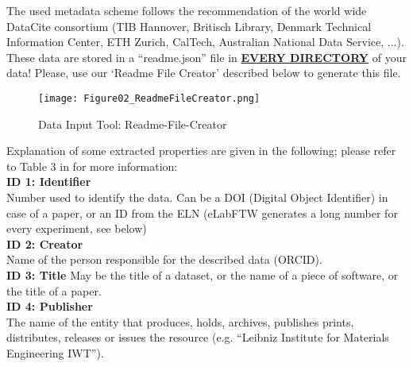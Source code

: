 The used metadata scheme follows the recommendation of the world wide DataCite
consortium (TIB Hannover, Britisch Library, Denmark Technical Information
Center, ETH Zurich, CalTech, Australian National Data Service, ...). These data
are stored in a “readme.json” file in \textbf{\underline{EVERY DIRECTORY}} of
your data! Please, use our ‘Readme File Creator’ described below to generate
this file. \\
\begin{wrapfigure}{r}{0.5\linewidth}
  \vspace{-1em}
  \texttt{[image: Figure02\_ReadmeFileCreator.png]}
  \caption{Data Input Tool: Readme-File-Creator}
  \label{fig:readme-creator}
\end{wrapfigure}
Explanation of some extracted properties are given in the following; please
refer to Table 3 in \cite{datacite2019} for more information: \\[6pt]
%
\textbf{ID 1: Identifier} \\
Number used to identify the data. Can be a DOI (Digital Object Identifier) in
case of a paper, or an ID from the ELN (eLabFTW generates a long number for
every experiment, see below) \\[6pt]
%
\textbf{ID 2: Creator} \\
Name of the person responsible for the described data (ORCID). \\[6pt]
%
\textbf{ID 3: Title}
May be the title of a dataset, or the name of a piece of software, or the
title of a paper. \\[6pt]
%
\textbf{ID 4: Publisher} \\
The name of the entity that produces, holds, archives, publishes prints,
distributes, releases or issues the resource (e.g. “Leibniz Institute for
Materials Engineering IWT”). \\[6pt]


